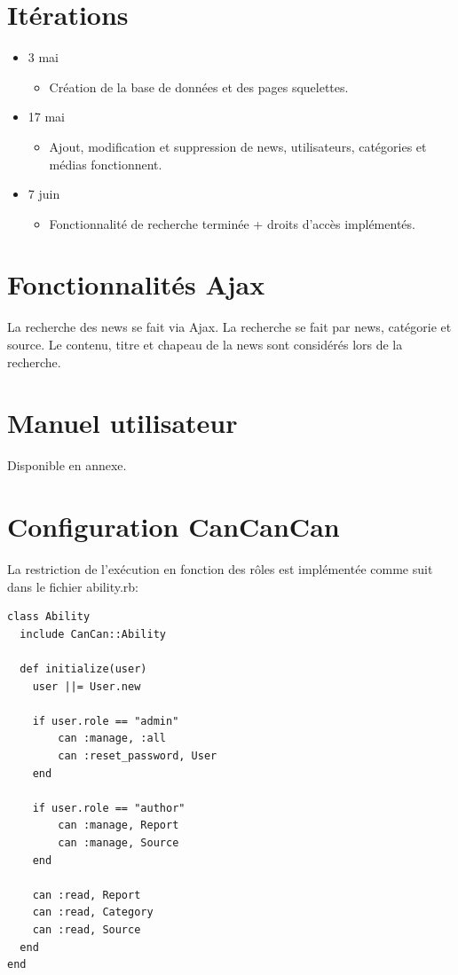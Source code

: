 \documentclass{article}
\begin{document}
\section{Itérations}

\begin{itemize}
\item 3 mai
	\begin{itemize}
	\item Création de la base de données et des pages squelettes.
	\end{itemize}
	
\item 17 mai
	\begin{itemize}
	\item Ajout, modification et suppression de news, utilisateurs, catégories et médias fonctionnent.
	\end{itemize}

\item 7 juin
	\begin{itemize}
	\item Fonctionnalité de recherche terminée + droits d'accès implémentés.
	\end{itemize}
\end{itemize}

\section{Fonctionnalités Ajax}

La recherche des news se fait via Ajax. La recherche se fait par news, catégorie et source. Le contenu, titre et chapeau de la news sont considérés lors de la recherche.

\section{Manuel utilisateur}

Disponible en annexe.

\section{Configuration CanCanCan}

La restriction de l'exécution en fonction des rôles est implémentée comme suit dans le fichier ability.rb:
\begin{lstlisting}
class Ability
  include CanCan::Ability

  def initialize(user)
    user ||= User.new
	
	if user.role == "admin"
		can :manage, :all
		can :reset_password, User
	end
	
	if user.role == "author"
		can :manage, Report
		can :manage, Source
	end
	
	can :read, Report
	can :read, Category
	can :read, Source
  end
end
\end{lstlisting}
\end{document}
